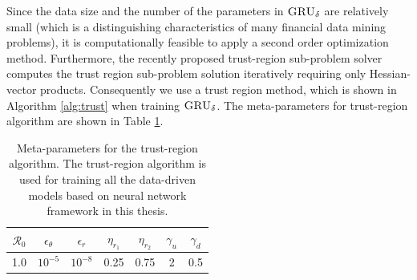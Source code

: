 \documentclass[letterpaper,12pt,titlepage,oneside,final]{book}
\numberwithin{equation}{section}
\theoremstyle{definition}
\newcommand{\model}{\textsc{GRU}_\delta}
\begin{document}
Since the data size and the number of the parameters in $\model$ are relatively small (which is a distinguishing characteristics of many financial data mining  problems), it is computationally feasible to apply a second order optimization method.  Furthermore, the recently proposed trust-region sub-problem solver \citep{lenders2018trlib} computes the trust region sub-problem solution iteratively requiring only Hessian-vector products. %
Consequently we use a trust region method, which is shown in Algorithm \ref{alg:trust} when training $\model$.  The meta-parameters for trust-region algorithm are shown in Table \ref{para2}. 
\begin{table}[htp!]
	\begin{center}
	\begin{tabular}{|c|c|c|c|c|c|c|}
	\hline
	$\mathcal{R}_0$&
	$\epsilon_{\theta}$& 
	$\epsilon_{r}$&
	$\eta_{r_1}$&
	$\eta_{r_2}$&
	$\gamma_u$&
	$\gamma_d$  \\ \hline
	 1.0&$10^{-5}$&$10^{-8}$&0.25&0.75 &2 & 0.5  \\    \hline
	\end{tabular}
	\end{center}
	
	\caption{Meta-parameters for the trust-region algorithm. The trust-region algorithm is used for training  all the data-driven models based on neural network framework in this thesis.}
	\label{para2}
	\end{table}
\end{document}
